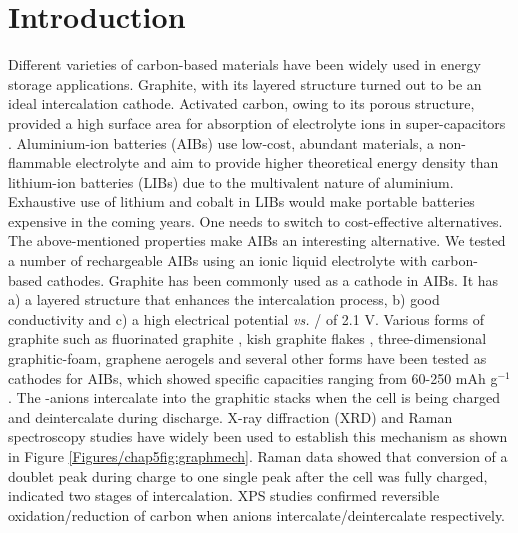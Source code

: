 \section{Introduction}
Different varieties of carbon-based materials have been widely used in energy storage applications. Graphite, with its layered structure turned out to be an ideal intercalation cathode. Activated carbon, owing to its porous structure, provided a high surface area for absorption of electrolyte ions in super-capacitors . Aluminium-ion batteries (AIBs) use low-cost, abundant materials, a non-flammable electrolyte and aim to provide higher theoretical energy density than lithium-ion batteries (LIBs) due to the multivalent nature of aluminium. Exhaustive use of lithium and cobalt in LIBs would make portable batteries expensive in the coming years. One needs to switch to cost-effective alternatives. The above-mentioned properties make AIBs an interesting alternative\cite{ambroz_trends_2017-1}. We tested a number of rechargeable AIBs using an ionic liquid electrolyte with carbon-based cathodes.
Graphite has been commonly used as a cathode in AIBs. It has a) a layered structure that enhances the intercalation process, b) good conductivity and c) a high electrical potential {\it vs.} / of 2.1 V. Various forms of graphite such as fluorinated graphite \cite{rani_fluorinated_2013}, kish graphite flakes \cite{wang_kish_2017-1}, three-dimensional graphitic-foam\cite{wu_3d_2016}, graphene aerogels\cite{huang_graphene_2019} and several other forms have been tested as cathodes for AIBs, which showed specific capacities ranging from 60-250 mAh g$^{-1}$. The -anions intercalate into the graphitic stacks when the cell is being charged and deintercalate during discharge. X-ray diffraction (XRD) and Raman spectroscopy studies have widely been used to establish this mechanism\cite{rani_fluorinated_2013, wang_advanced_2017, lin_ultrafast_2015-3} as shown in Figure \ref{Figures/chap5fig:graphmech}. Raman data showed that conversion of a doublet peak during charge to one single peak after the cell was fully charged, indicated two stages of intercalation. XPS studies confirmed reversible oxidation/reduction of carbon when  anions intercalate/deintercalate respectively\cite{stadie_zeolite-templated_2017, liu_binder-free_2019}.

